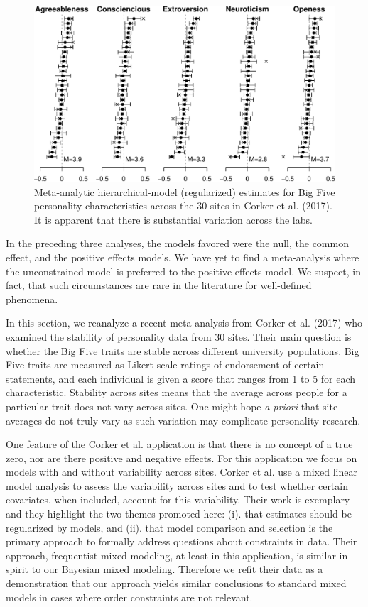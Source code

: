 \documentclass[english,man]{apa6}
\theoremstyle{definition}
\theoremstyle{definition}
\theoremstyle{remark}
\begin{document}
\begin{figure}[htbp]
\centering
\includegraphics{p_files/figure-latex/corkerEst-1.pdf}
\caption{\label{fig:corkerEst}Meta-analytic hierarchical-model (regularized)
estimates for Big Five personality characteristics across the 30 sites
in Corker et al. (2017). It is apparent that there is substantial
variation across the labs.}
\end{figure}

In the preceding three analyses, the models favored were the null, the
common effect, and the positive effects models. We have yet to find a
meta-analysis where the unconstrained model is preferred to the positive
effects model. We suspect, in fact, that such circumstances are rare in
the literature for well-defined phenomena.

In this section, we reanalyze a recent meta-analysis from Corker et al.
(2017) who examined the stability of personality data from 30 sites.
Their main question is whether the Big Five traits are stable across
different university populations. Big Five traits are measured as Likert
scale ratings of endorsement of certain statements, and each individual
is given a score that ranges from 1 to 5 for each characteristic.
Stability across sites means that the average across people for a
particular trait does not vary across sites. One might hope \emph{a
priori} that site averages do not truly vary as such variation may
complicate personality research.

One feature of the Corker et al. application is that there is no concept
of a true zero, nor are there positive and negative effects. For this
application we focus on models with and without variability across
sites. Corker et al. use a mixed linear model analysis to assess the
variability across sites and to test whether certain covariates, when
included, account for this variability. Their work is exemplary and they
highlight the two themes promoted here: (i). that estimates should be
regularized by models, and (ii). that model comparison and selection is
the primary approach to formally address questions about constraints in
data. Their approach, frequentist mixed modeling, at least in this
application, is similar in spirit to our Bayesian mixed modeling.
Therefore we refit their data as a demonstration that our approach
yields similar conclusions to standard mixed models in cases where order
constraints are not relevant.
\end{document}
